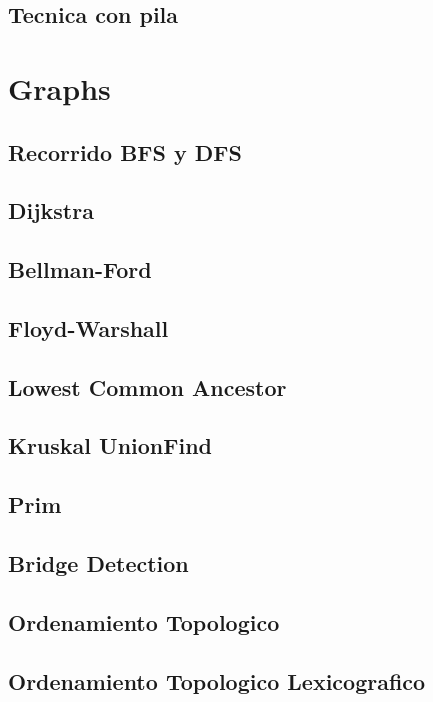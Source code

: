 \subsection{Tecnica con pila}
\raggedbottom
\hrulefill
\newpage

\section{Graphs}
\subsection{Recorrido BFS y DFS}
\raggedbottom
\hrulefill
\subsection{Dijkstra}
\raggedbottom
\hrulefill
\subsection{Bellman-Ford}
\raggedbottom
\hrulefill
\subsection{Floyd-Warshall}
\raggedbottom
\hrulefill
\subsection{Lowest Common Ancestor}
\raggedbottom
\hrulefill
\subsection{Kruskal UnionFind}
\raggedbottom
\hrulefill
\subsection{Prim}
\raggedbottom
\hrulefill
\subsection{Bridge Detection}
\raggedbottom
\hrulefill
\subsection{Ordenamiento Topologico}
\raggedbottom
\hrulefill
\subsection{Ordenamiento Topologico Lexicografico}
\raggedbottom
\hrulefill
\newpage

